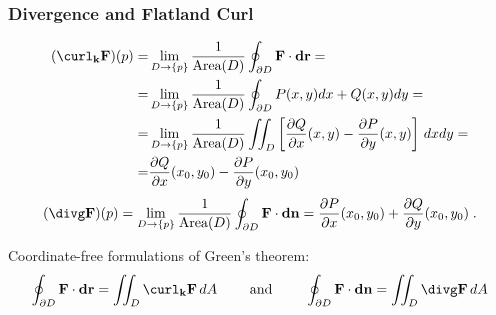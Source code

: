 \begin{frame}
  \frametitle{Divergence and Flatland Curl}

  \begin{align*}(\curl_{\textbf{k}} \textbf{F})(p) = &  \lim_{D \to \{ p \}}  \frac{1}{\text{Area}(D)} \oint_{\partial D} \textbf{F} \cdot \textbf{dr} = \\
  =& \lim_{D \to \{ p \}}  \frac{1}{\text{Area}(D)} \oint_{\partial D} P(x,y) dx+Q(x,y)dy = \\
  = & \lim_{D \to \{ p\}}  \frac{1}{\text{Area}(D)} \iint_{D} \left[\frac{\partial Q}{\partial x} (x,y) - \frac{\partial P}{\partial y} (x,y) \right] \, dxdy = \\
  = & \frac{\partial Q}{\partial x} (x_0,y_0) - \frac{\partial P}{\partial y} (x_0,y_0)
  \end{align*}
%
$$
  (\divg \textbf{F})(p) = \lim_{D \to \{p\}} \frac{1}{\text{Area}(D)} \oint_{\partial D} \textbf{F} \cdot \textbf{dn}   = \frac{\partial P}{\partial x} (x_0,y_0) + \frac{\partial Q}{\partial y} (x_0,y_0) \; .
$$

\pause Coordinate-free formulations of Green's theorem:
%
$$\oint_{\partial D} \textbf{F} \cdot \textbf{dr} = \iint_D \curl_{\textbf{k}} \textbf{F} \, dA \qquad \text{ and } \qquad
\oint_{\partial D} \textbf{F} \cdot \textbf{dn} = \iint_{D} \divg \textbf{F} \, dA$$

\end{frame}

